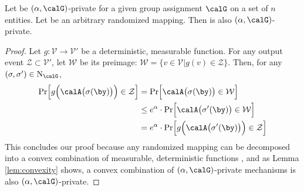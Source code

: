 \begin{thm}\label{theorem:post}
Let  be  $(\alpha,\calG)$-\name private for a given group assignment $\calG$ on a set of $n$ entities. Let  be an
arbitrary randomized mapping. Then  is also $(\alpha,\calG)$-\name private. \vspace{-0.2cm}\end{thm}

\begin{proof}
Let $g: \mathcal{V}\rightarrow \mathcal{V}'$ be a deterministic, measurable function. For any output event $\mathcal{Z}\subset \mathcal{V}'$, let $\mathcal{W}$ be its preimage: \newline $\mathcal{W}=\{v \in \mathcal{V}| g(v) \in \mathcal{Z}\}$. Then, for any $(\sigma, \sigma') \in \mathrm{N}_\calG$,
\begin{align*}
    \mathrm{Pr}\Big[g\Big(\calA\big(\sigma(\by)\big)\Big)\in \mathcal{Z}\Big] 
    &= \mathrm{Pr}\Big[\calA\big(\sigma(\by)\big)\in \mathcal{W}\Big] \\ 
    &\leq e^{\alpha} \cdot \mathrm{Pr}\Big[\calA\big(\sigma'(\by)\big)\in \mathcal{W}\Big]\\ 
    &=e^{\alpha}\cdot \mathrm{Pr}\Big[g\Big(\calA\big(\sigma'(\by)\big)\Big)\in \mathcal{Z}\Big] 
\end{align*}
This concludes our proof because any randomized mapping
can be decomposed into a convex combination of measurable, deterministic functions \cite{Dwork}, and as Lemma \ref{lem:convexity} shows, a convex combination of $(\alpha,\calG)$-\name private mechanisms is also $(\alpha,\calG)$-\name private. 
\end{proof}

